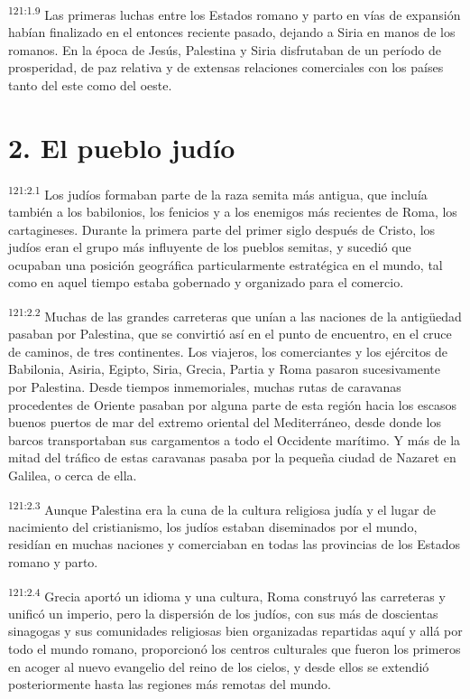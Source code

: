 \par
\textsuperscript{121:1.9} Las primeras luchas entre los Estados romano y parto en vías de expansión habían finalizado en el entonces reciente pasado, dejando a Siria en manos de los romanos. En la época de Jesús, Palestina y Siria disfrutaban de un período de prosperidad, de paz relativa y de extensas relaciones comerciales con los países tanto del este como del oeste.

\section*{2. El pueblo judío}
\par
\textsuperscript{121:2.1} Los judíos formaban parte de la raza semita más antigua, que incluía también a los babilonios, los fenicios y a los enemigos más recientes de Roma, los cartagineses. Durante la primera parte del primer siglo después de Cristo, los judíos eran el grupo más influyente de los pueblos semitas, y sucedió que ocupaban una posición geográfica particularmente estratégica en el mundo, tal como en aquel tiempo estaba gobernado y organizado para el comercio.

\par
\textsuperscript{121:2.2} Muchas de las grandes carreteras que unían a las naciones de la antig\"uedad pasaban por Palestina, que se convirtió así en el punto de encuentro, en el cruce de caminos, de tres continentes. Los viajeros, los comerciantes y los ejércitos de Babilonia, Asiria, Egipto, Siria, Grecia, Partia y Roma pasaron sucesivamente por Palestina. Desde tiempos inmemoriales, muchas rutas de caravanas procedentes de Oriente pasaban por alguna parte de esta región hacia los escasos buenos puertos de mar del extremo oriental del Mediterráneo, desde donde los barcos transportaban sus cargamentos a todo el Occidente marítimo. Y más de la mitad del tráfico de estas caravanas pasaba por la pequeña ciudad de Nazaret en Galilea, o cerca de ella.

\par
\textsuperscript{121:2.3} Aunque Palestina era la cuna de la cultura religiosa judía y el lugar de nacimiento del cristianismo, los judíos estaban diseminados por el mundo, residían en muchas naciones y comerciaban en todas las provincias de los Estados romano y parto.

\par
\textsuperscript{121:2.4} Grecia aportó un idioma y una cultura, Roma construyó las carreteras y unificó un imperio, pero la dispersión de los judíos, con sus más de doscientas sinagogas y sus comunidades religiosas bien organizadas repartidas aquí y allá por todo el mundo romano, proporcionó los centros culturales que fueron los primeros en acoger al nuevo evangelio del reino de los cielos, y desde ellos se extendió posteriormente hasta las regiones más remotas del mundo.

